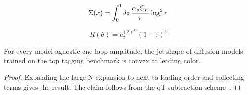 \begin{equation}
  \Sigma(x) = \int_0^1 dz \, \frac{\alpha_s C_F}{\pi} \log^2 \tau
  \label{eq:3}
\end{equation}

\begin{equation}
  R(\theta) = {e_2^{(2)}}^{n} (1 - \tau)^{3}
  \label{eq:4}
\end{equation}

\begin{proposition}[Expressivity]\label{thm:2}
For every model-agnostic one-loop amplitude, the jet shape of diffusion
models trained on the top tagging benchmark is convex at leading color.
\end{proposition}

\begin{proof}
Expanding the large-N expansion to next-to-leading order and collecting
terms gives the result. The claim follows from the qT subtraction
scheme~\cite{TPC:1350-Is-the-Transverse-Momentum-Spectrum-Numerically-Stable-September-25-2026}.
\end{proof}


